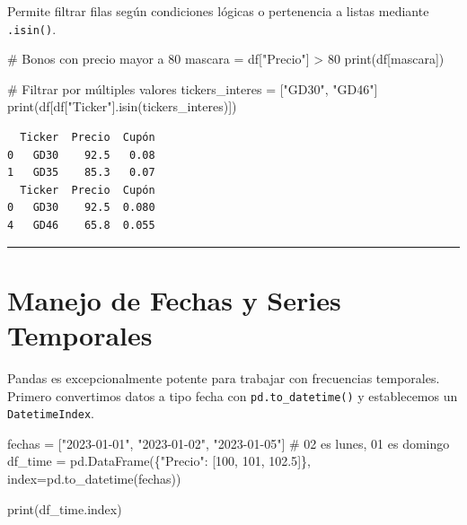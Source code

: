 \documentclass[
  spanish,
  letterpaper,
  DIV=11,
  numbers=noendperiod]{scrreprt}
\newenvironment{Shaded}{\begin{snugshade}}{\end{snugshade}}
\newcommand{\BuiltInTok}[1]{\textcolor[rgb]{0.00,0.23,0.31}{#1}}
\newcommand{\CommentTok}[1]{\textcolor[rgb]{0.37,0.37,0.37}{#1}}
\newcommand{\DecValTok}[1]{\textcolor[rgb]{0.68,0.00,0.00}{#1}}
\newcommand{\FloatTok}[1]{\textcolor[rgb]{0.68,0.00,0.00}{#1}}
\newcommand{\NormalTok}[1]{\textcolor[rgb]{0.00,0.23,0.31}{#1}}
\newcommand{\OperatorTok}[1]{\textcolor[rgb]{0.37,0.37,0.37}{#1}}
\newcommand{\StringTok}[1]{\textcolor[rgb]{0.13,0.47,0.30}{#1}}
\begin{document}
Permite filtrar filas según condiciones lógicas o pertenencia a listas
mediante \texttt{.isin()}.

\label{filtrado}
\begin{Shaded}
\begin{Highlighting}[]
\CommentTok{\# Bonos con precio mayor a 80}
\NormalTok{mascara }\OperatorTok{=}\NormalTok{ df[}\StringTok{"Precio"}\NormalTok{] }\OperatorTok{\textgreater{}} \DecValTok{80}
\BuiltInTok{print}\NormalTok{(df[mascara])}

\CommentTok{\# Filtrar por múltiples valores}
\NormalTok{tickers\_interes }\OperatorTok{=}\NormalTok{ [}\StringTok{"GD30"}\NormalTok{, }\StringTok{"GD46"}\NormalTok{]}
\BuiltInTok{print}\NormalTok{(df[df[}\StringTok{"Ticker"}\NormalTok{].isin(tickers\_interes)])}
\end{Highlighting}
\end{Shaded}

\begin{verbatim}
  Ticker  Precio  Cupón
0   GD30    92.5   0.08
1   GD35    85.3   0.07
  Ticker  Precio  Cupón
0   GD30    92.5  0.080
4   GD46    65.8  0.055
\end{verbatim}

\begin{center}\rule{0.5\linewidth}{0.5pt}\end{center}

\section{Manejo de Fechas y Series
Temporales}\label{manejo-de-fechas-y-series-temporales}

Pandas es excepcionalmente potente para trabajar con frecuencias
temporales. Primero convertimos datos a tipo fecha con
\texttt{pd.to\_datetime()} y establecemos un \texttt{DatetimeIndex}.

\label{time-series}
\begin{Shaded}
\begin{Highlighting}[]
\NormalTok{fechas }\OperatorTok{=}\NormalTok{ [}\StringTok{"2023{-}01{-}01"}\NormalTok{, }\StringTok{"2023{-}01{-}02"}\NormalTok{, }\StringTok{"2023{-}01{-}05"}\NormalTok{] }\CommentTok{\# 02 es lunes, 01 es domingo}
\NormalTok{df\_time }\OperatorTok{=}\NormalTok{ pd.DataFrame(\{}\StringTok{"Precio"}\NormalTok{: [}\DecValTok{100}\NormalTok{, }\DecValTok{101}\NormalTok{, }\FloatTok{102.5}\NormalTok{]\}, index}\OperatorTok{=}\NormalTok{pd.to\_datetime(fechas))}

\BuiltInTok{print}\NormalTok{(df\_time.index)}
\end{Highlighting}
\end{Shaded}
\end{document}
